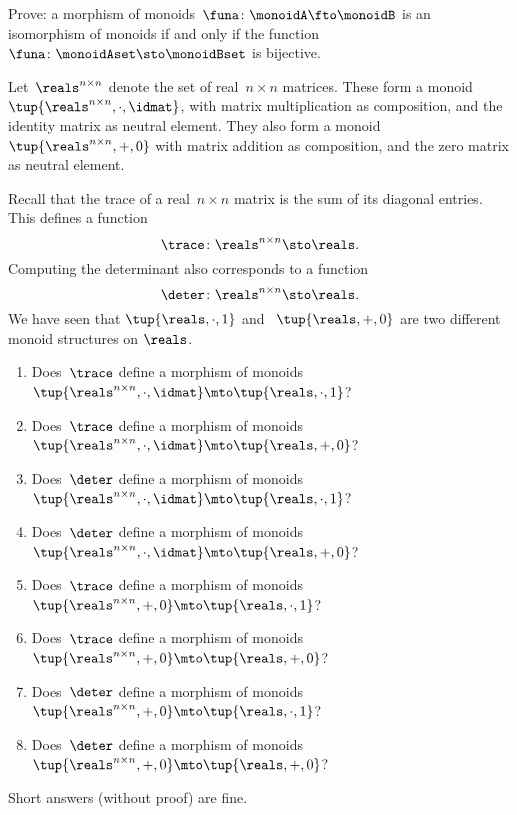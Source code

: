 \begin{gradedexercise}
    Prove: a morphism of monoids~$\funa\colon \monoidA \fto \monoidB$ is an isomorphism of monoids if and only if the function~$\funa\colon \monoidAset \sto \monoidBset$ is bijective.
\end{gradedexercise}



\begin{gradedexercise}
    \label{ex:TraceAndDeterminant}
    Let~$\reals^{n \times n}$ denote the set of real~$n \times n$ matrices. These form a monoid~$\tup{\reals^{n \times n}, \cdot, \idmat}$, with matrix multiplication as composition, and the identity matrix as neutral element. They also form a monoid $\tup{\reals^{n \times n}, + , 0}$ with matrix addition as composition, and the zero matrix as neutral element.
    
    Recall that the trace of a real~$n \times n$ matrix is the sum of its diagonal entries. This defines a function
    \begin{equation}
        \trace \colon \reals^{n \times n} \sto \reals.
    \end{equation}
    Computing the determinant also corresponds to a function
    \begin{equation}
        \deter \colon \reals^{n \times n} \sto \reals.
    \end{equation}
    We have seen that $\tup{ \reals, \cdot, 1}$ and ~$\tup{ \reals, +, 0}$ are two different monoid structures on $\reals$.
    \begin{enumerate}
        \item Does~$\trace$ define a morphism of monoids~$\tup{\reals^{n \times n}, \cdot, \idmat} \mto \tup{ \reals, \cdot, 1}$?
        \item Does~$\trace$ define a morphism of monoids~$\tup{\reals^{n \times n}, \cdot, \idmat} \mto \tup{ \reals, + , 0}$?
        \item Does~$\deter$ define a morphism of monoids~$\tup{\reals^{n \times n}, \cdot, \idmat} \mto \tup{ \reals, \cdot, 1}$?
        \item Does~$\deter$ define a morphism of monoids~$\tup{\reals^{n \times n}, \cdot, \idmat} \mto \tup{ \reals, + , 0}$?
        \item Does~$\trace$ define a morphism of monoids~$\tup{\reals^{n \times n}, +, 0} \mto \tup{ \reals, \cdot, 1}$?
        \item Does~$\trace$ define a morphism of monoids~$\tup{\reals^{n \times n}, +, 0} \mto \tup{ \reals, + , 0}$?
        \item Does~$\deter$ define a morphism of monoids~$\tup{\reals^{n \times n}, +, 0} \mto \tup{ \reals, \cdot, 1}$?
        \item Does~$\deter$ define a morphism of monoids~$\tup{\reals^{n \times n}, +, 0} \mto \tup{ \reals, + , 0}$?
    \end{enumerate}
    Short answers (without proof) are fine.
\end{gradedexercise}


